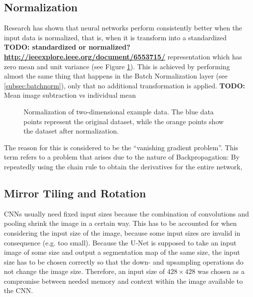 		\subsection{Normalization}
Research \cite{lecun_norm} has shown that neural networks perform consistently better when the input data is normalized, that is, when it is transform into a standardized \textbf{TODO: standardized or normalized? \url{http://ieeexplore.ieee.org/document/6553715/}} representation which has zero mean and unit variance (see Figure \ref{fig:norma}). This is achieved by performing almost the same thing that happens in the Batch Normalization layer (see \ref{subsec:batchnorm}), only that no additional transformation is applied. \textbf{TODO:} Mean image subtraction vs individual mean

\begin {figure}[!ht]
	\begin{center}
		
	\end{center}
	\caption[]{Normalization of two-dimensional example data. The blue data points represent the original dataset, while the orange points show the dataset after normalization.}
	\label{fig:norma}
\end {figure}

\noindent The reason for this is considered to be the ``vanishing gradient problem''. This term refers to a problem that arises due to the nature of Backpropagation: By repeatedly using the chain rule to obtain the derivatives for the entire network, 


		\subsection{Mirror Tiling and Rotation}
\label{subsec:mirror_tiling}
CNNs usually need fixed input sizes because the combination of convolutions and pooling shrink the image in a certain way. This has to be accounted for when considering the input size of the image, because some input sizes are invalid in consequence (e.g. too small). Because the U-Net is supposed to take an input image of some size and output a segmentation map of the same size, the input size has to be chosen correctly so that the down- and upsampling operations do not change the image size. Therefore, an input size of $428 \times 428$ was chosen as a compromise between needed memory and context within the image available to the CNN.

